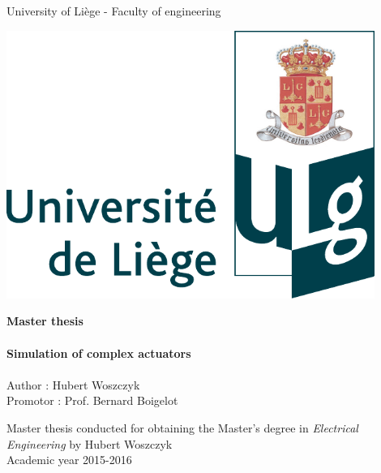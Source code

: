\begin{titlepage}


\begin{center}
\large
University of Liège - Faculty of engineering
\end{center}

\vfill

\begin{minipage}{0.5\textwidth}
\includegraphics[width=0.9\textwidth]{figures/ULg_logo_couleur.pdf}
\end{minipage}
\begin{minipage}{0.5\textwidth}
\huge
\textbf{Master thesis}\\\\
\normalsize
\textbf{Simulation of complex actuators}\\\\
Author : Hubert Woszczyk\\
Promotor : Prof. Bernard Boigelot\\
\end{minipage}

\vfill
\begin{center}
\large
Master thesis conducted for obtaining the Master's degree in \emph{Electrical Engineering} by Hubert Woszczyk\\
\vspace*{8cm}
\large
Academic year 2015-2016
\end{center}

\end{titlepage}

\newpage\null\thispagestyle{empty}\newpage

